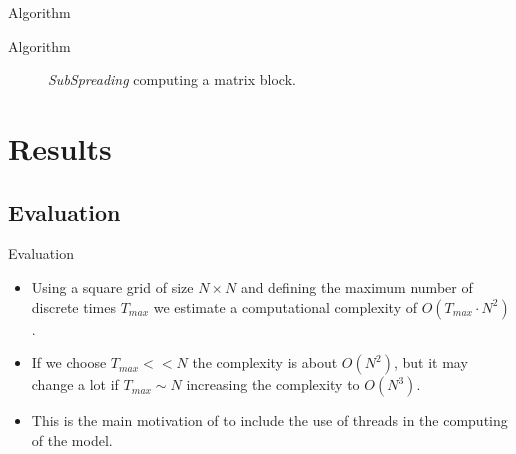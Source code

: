 \documentclass{beamer}
\begin{document}
        \begin{frame}{Algorithm}
            \begin{algorithm}[H]
                \begin{algorithmic}
                            \EndFor
                        \EndFor
                    \EndProcedure
                \end{algorithmic}
                \caption{Sub-spreading Algorithm}
                \label{alg:subspreading}
            \end{algorithm}
        \end{frame}
        
        \begin{frame}{Algorithm}
            \begin{figure}
                \centering
                \resizebox{0.65\textwidth}{!}{
                    
                }    
                \caption{\emph{SubSpreading} computing a matrix block.}
                \label{fig:thread}
            \end{figure}
        \end{frame}
        
    \section{Results}
        \subsection{Evaluation}
        
        \begin{frame}{Evaluation}
            \begin{itemize}
                \item<1-> Using a square grid of size $N \times N$ and defining the maximum number
                    of discrete times $T_{max}$ we estimate a computational complexity of $O(T_{max}\cdot N^2)$. 
                \item<2-> If we choose $T_{max} << N$ the complexity is about $O(N^2)$, but it 
                    may change a lot if $T_{max}\sim N$ increasing the complexity to $O(N^3)$. 
                \item<3-> This is the main  motivation of to include the use of threads in the computing of the model.
            \end{itemize} 
        \end{frame}
        
\end{document}
